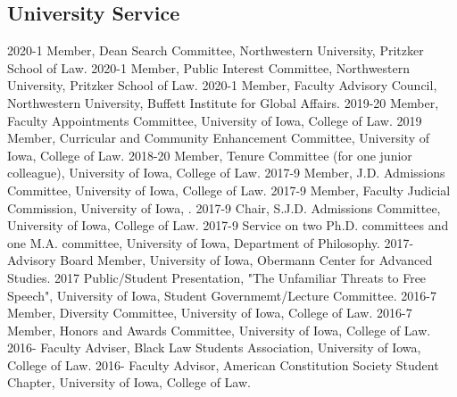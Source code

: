 \documentclass[letterpaper]{moderncv}
\begin{document}
\subsection{University Service}
\cvitem
{2020-1}
{Member, Dean Search Committee, Northwestern University, Pritzker School of Law.}
\vspace{1mm}
\cvitem
{2020-1}
{Member, Public Interest Committee, Northwestern University, Pritzker School of Law.}
\vspace{1mm}
\cvitem
{2020-1}
{Member, Faculty Advisory Council, Northwestern University, Buffett Institute for Global Affairs.}
\vspace{1mm}
\cvitem
{2019-20}
{Member, Faculty Appointments Committee, University of Iowa, College of Law.}
\vspace{1mm}
\cvitem
{2019}
{Member, Curricular and Community Enhancement Committee, University of Iowa, College of Law.}
\vspace{1mm}
\cvitem
{2018-20}
{Member, Tenure Committee (for one junior colleague), University of Iowa, College of Law.}
\vspace{1mm}
\cvitem
{2017-9}
{Member, J.D. Admissions Committee, University of Iowa, College of Law.}
\vspace{1mm}
\cvitem
{2017-9}
{Member, Faculty Judicial Commission, University of Iowa, .}
\vspace{1mm}
\cvitem
{2017-9}
{Chair, S.J.D. Admissions Committee, University of Iowa, College of Law.}
\vspace{1mm}
\cvitem
{2017-9}
{Service on two Ph.D. committees and one M.A. committee, University of Iowa, Department of Philosophy.}
\vspace{1mm}
\cvitem
{2017-}
{Advisory Board Member, University of Iowa, Obermann Center for Advanced Studies.}
\vspace{1mm}
\cvitem
{2017}
{Public/Student Presentation, "The Unfamiliar Threats to Free Speech", University of Iowa, Student Governmemt/Lecture Committee.}
\vspace{1mm}
\cvitem
{2016-7}
{Member, Diversity Committee, University of Iowa, College of Law.}
\vspace{1mm}
\cvitem
{2016-7}
{Member, Honors and Awards Committee, University of Iowa, College of Law.}
\vspace{1mm}
\cvitem
{2016-}
{Faculty Adviser, Black Law Students Association, University of Iowa, College of Law.}
\vspace{1mm}
\cvitem
{2016-}
{Faculty Advisor, American Constitution Society Student Chapter, University of Iowa, College of Law.}
\end{document}
